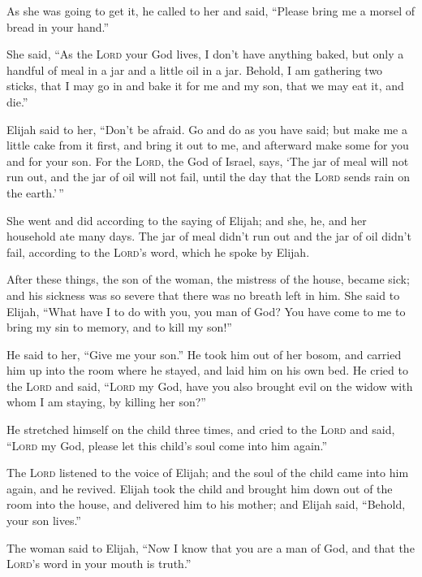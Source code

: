  As she was going to get it, he called to her and said,
``Please bring me a morsel of bread in your hand.''

 She said, ``As the \textsc{Lord} your God lives, I don't
have anything baked, but only a handful of meal in a jar and a little
oil in a jar. Behold, I am gathering two sticks, that I may go in and
bake it for me and my son, that we may eat it, and die.''

 Elijah said to her, ``Don't be afraid. Go and do as you
have said; but make me a little cake from it first, and bring it out to
me, and afterward make some for you and for your son. 
For the \textsc{Lord}, the God of Israel, says, `The jar of meal will
not run out, and the jar of oil will not fail, until the day that the
\textsc{Lord} sends rain on the earth.'\,''

 She went and did according to the saying of Elijah; and
she, he, and her household ate many days.  The jar of
meal didn't run out and the jar of oil didn't fail, according to the
\textsc{Lord}'s word, which he spoke by Elijah.

 After these things, the son of the woman, the mistress
of the house, became sick; and his sickness was so severe that there was
no breath left in him.  She said to Elijah, ``What have I
to do with you, you man of God? You have come to me to bring my sin to
memory, and to kill my son!''

 He said to her, ``Give me your son.'' He took him out of
her bosom, and carried him up into the room where he stayed, and laid
him on his own bed.  He cried to the \textsc{Lord} and
said, ``\textsc{Lord} my God, have you also brought evil on the widow
with whom I am staying, by killing her son?''

 He stretched himself on the child three times, and cried
to the \textsc{Lord} and said, ``\textsc{Lord} my God, please let this
child's soul come into him again.''

 The \textsc{Lord} listened to the voice of Elijah; and
the soul of the child came into him again, and he revived.
 Elijah took the child and brought him down out of the
room into the house, and delivered him to his mother; and Elijah said,
``Behold, your son lives.''

 The woman said to Elijah, ``Now I know that you are a
man of God, and that the \textsc{Lord}'s word in your mouth is truth.''

